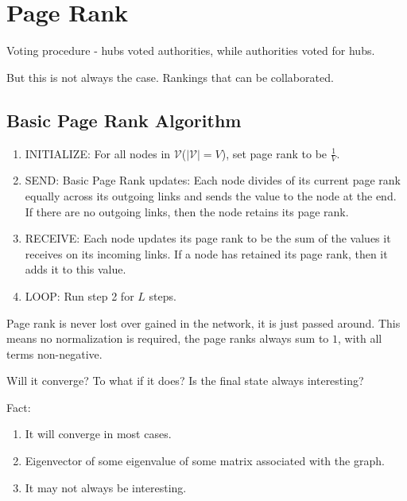 \chapter{Page Rank}
\begin{prev}
	Voting procedure - hubs voted authorities, while authorities voted for hubs.
\end{prev}

But this is not always the case. Rankings that can be collaborated.
\section{Basic Page Rank Algorithm}
\begin{enumerate}
	\item INITIALIZE: For all nodes in \(\mathcal{V}\)(\(\left\vert \mathcal{V} \right\vert = V\)),
	      set page rank to be \(\frac{1}{V}\).
	\item SEND: Basic Page Rank updates: Each node divides of its current page rank equally across its outgoing
	      links and sends the value to the node at the end. If there are no outgoing links, then the node retains its page rank.
	\item RECEIVE: Each node updates its page rank to be the sum of the values it receives on its incoming links. If
	      a node has retained its page rank, then it adds it to this value.
	\item LOOP: Run step 2 for \(L\) steps.
\end{enumerate}
\begin{note}
	Page rank is never lost over gained in the network, it is just passed around. This means no normalization is required,
	the page ranks always sum to \(1\), with all terms non-negative.
\end{note}

\begin{problem}
Will it converge? To what if it does? Is the final state always interesting?
\end{problem}
\begin{answer}
	Fact: \begin{enumerate}
		\item It will converge in most cases.
		\item Eigenvector of some eigenvalue of some matrix associated with the graph.
		\item It may not always be interesting.
	\end{enumerate}
\end{answer}

